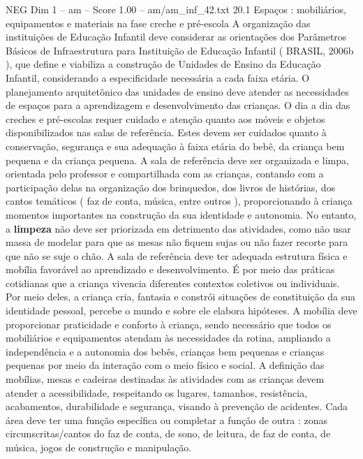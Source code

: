 \begin{textsample}{NEG Dim 1 – am – Score 1.00 – am/am\_inf\_42.txt}  \label{ex:f1_neg_062}
20.1 Espaços : mobiliários, equipamentos e materiais na fase creche e pré-escola A organização das instituições de Educação Infantil deve considerar as orientações dos Parâmetros Básicos de Infraestrutura para Instituição de Educação Infantil ( BRASIL, 2006b ), que define e viabiliza a construção de Unidades de Ensino da Educação Infantil, considerando a especificidade necessária a cada faixa etária.
O planejamento arquitetônico das unidades de ensino deve atender as necessidades de espaços para a aprendizagem e desenvolvimento das crianças.
O dia a dia das creches e pré-escolas requer cuidado e atenção quanto aos móveis e objetos disponibilizados nas salas de referência.
Estes devem ser cuidados quanto à conservação, segurança e sua adequação à faixa etária do bebê, da criança bem pequena e da criança pequena.
A sala de referência deve ser organizada e limpa, orientada pelo professor e compartilhada com as crianças, contando com a participação delas na organização dos brinquedos, dos livros de histórias, dos cantos temáticos ( faz de conta, música, entre outros ), proporcionando à criança momentos importantes na construção da sua identidade e autonomia.
No entanto, a \textbf{limpeza} não deve ser priorizada em detrimento das atividades, como não usar massa de modelar para que as mesas não fiquem sujas ou não fazer recorte para que não se suje o chão.
A sala de referência deve ter adequada estrutura física e mobília favorável ao aprendizado e desenvolvimento.
É por meio das práticas cotidianas que a criança vivencia diferentes contextos coletivos ou individuais.
Por meio deles, a criança cria, fantasia e constrói situações de constituição da sua identidade pessoal, percebe o mundo e sobre ele elabora hipóteses.
A mobília deve proporcionar praticidade e conforto à criança, sendo necessário que todos os mobiliários e equipamentos atendam às necessidades da rotina, ampliando a independência e a autonomia dos bebês, crianças bem pequenas e crianças pequenas por meio da interação com o meio físico e social.
A definição das mobílias, mesas e cadeiras destinadas às atividades com as crianças devem atender a acessibilidade, respeitando os lugares, tamanhos, resistência, acabamentos, durabilidade e segurança, visando à prevenção de acidentes.
Cada área deve ter uma função específica ou completar a função de outra : zonas circunscritas/cantos do faz de conta, de sono, de leitura, de faz de conta, de música, jogos de construção e manipulação.

\end{textsample}
